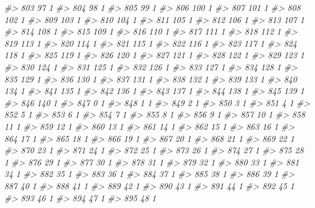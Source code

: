 \documentclass[]{article}
\newenvironment{Shaded}{\begin{snugshade}}{\end{snugshade}}
\newcommand{\CommentTok}[1]{\textcolor[rgb]{0.56,0.35,0.01}{\textit{#1}}}
\begin{document}
\begin{Shaded}
\begin{Highlighting}[]
\CommentTok{#> 803   97  1}
\CommentTok{#> 804   98  1}
\CommentTok{#> 805   99  1}
\CommentTok{#> 806  100  1}
\CommentTok{#> 807  101  1}
\CommentTok{#> 808  102  1}
\CommentTok{#> 809  103  1}
\CommentTok{#> 810  104  1}
\CommentTok{#> 811  105  1}
\CommentTok{#> 812  106  1}
\CommentTok{#> 813  107  1}
\CommentTok{#> 814  108  1}
\CommentTok{#> 815  109  1}
\CommentTok{#> 816  110  1}
\CommentTok{#> 817  111  1}
\CommentTok{#> 818  112  1}
\CommentTok{#> 819  113  1}
\CommentTok{#> 820  114  1}
\CommentTok{#> 821  115  1}
\CommentTok{#> 822  116  1}
\CommentTok{#> 823  117  1}
\CommentTok{#> 824  118  1}
\CommentTok{#> 825  119  1}
\CommentTok{#> 826  120  1}
\CommentTok{#> 827  121  1}
\CommentTok{#> 828  122  1}
\CommentTok{#> 829  123  1}
\CommentTok{#> 830  124  1}
\CommentTok{#> 831  125  1}
\CommentTok{#> 832  126  1}
\CommentTok{#> 833  127  1}
\CommentTok{#> 834  128  1}
\CommentTok{#> 835  129  1}
\CommentTok{#> 836  130  1}
\CommentTok{#> 837  131  1}
\CommentTok{#> 838  132  1}
\CommentTok{#> 839  133  1}
\CommentTok{#> 840  134  1}
\CommentTok{#> 841  135  1}
\CommentTok{#> 842  136  1}
\CommentTok{#> 843  137  1}
\CommentTok{#> 844  138  1}
\CommentTok{#> 845  139  1}
\CommentTok{#> 846  140  1}
\CommentTok{#> 847    0  1}
\CommentTok{#> 848    1  1}
\CommentTok{#> 849    2  1}
\CommentTok{#> 850    3  1}
\CommentTok{#> 851    4  1}
\CommentTok{#> 852    5  1}
\CommentTok{#> 853    6  1}
\CommentTok{#> 854    7  1}
\CommentTok{#> 855    8  1}
\CommentTok{#> 856    9  1}
\CommentTok{#> 857   10  1}
\CommentTok{#> 858   11  1}
\CommentTok{#> 859   12  1}
\CommentTok{#> 860   13  1}
\CommentTok{#> 861   14  1}
\CommentTok{#> 862   15  1}
\CommentTok{#> 863   16  1}
\CommentTok{#> 864   17  1}
\CommentTok{#> 865   18  1}
\CommentTok{#> 866   19  1}
\CommentTok{#> 867   20  1}
\CommentTok{#> 868   21  1}
\CommentTok{#> 869   22  1}
\CommentTok{#> 870   23  1}
\CommentTok{#> 871   24  1}
\CommentTok{#> 872   25  1}
\CommentTok{#> 873   26  1}
\CommentTok{#> 874   27  1}
\CommentTok{#> 875   28  1}
\CommentTok{#> 876   29  1}
\CommentTok{#> 877   30  1}
\CommentTok{#> 878   31  1}
\CommentTok{#> 879   32  1}
\CommentTok{#> 880   33  1}
\CommentTok{#> 881   34  1}
\CommentTok{#> 882   35  1}
\CommentTok{#> 883   36  1}
\CommentTok{#> 884   37  1}
\CommentTok{#> 885   38  1}
\CommentTok{#> 886   39  1}
\CommentTok{#> 887   40  1}
\CommentTok{#> 888   41  1}
\CommentTok{#> 889   42  1}
\CommentTok{#> 890   43  1}
\CommentTok{#> 891   44  1}
\CommentTok{#> 892   45  1}
\CommentTok{#> 893   46  1}
\CommentTok{#> 894   47  1}
\CommentTok{#> 895   48  1}

\end{Highlighting}
\end{Shaded}
\end{document}
